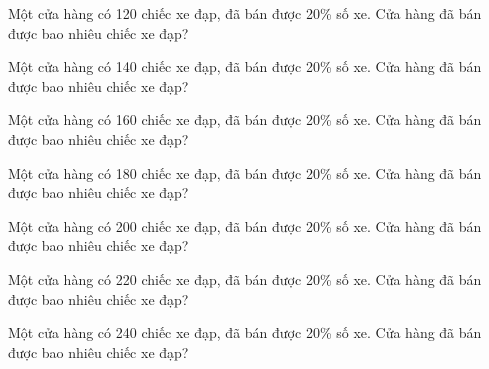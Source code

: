 
\begin{ex}
  Một cửa hàng có 120 chiếc xe đạp, đã bán được 20\% số xe. Cửa hàng đã bán được bao nhiêu chiếc xe đạp?
\end{ex}

\begin{ex}
  Một cửa hàng có 140 chiếc xe đạp, đã bán được 20\% số xe. Cửa hàng đã bán được bao nhiêu chiếc xe đạp?
\end{ex}

\begin{ex}
  Một cửa hàng có 160 chiếc xe đạp, đã bán được 20\% số xe. Cửa hàng đã bán được bao nhiêu chiếc xe đạp?
\end{ex}

\begin{ex}
  Một cửa hàng có 180 chiếc xe đạp, đã bán được 20\% số xe. Cửa hàng đã bán được bao nhiêu chiếc xe đạp?
\end{ex}

\begin{ex}
  Một cửa hàng có 200 chiếc xe đạp, đã bán được 20\% số xe. Cửa hàng đã bán được bao nhiêu chiếc xe đạp?
\end{ex}

\begin{ex}
  Một cửa hàng có 220 chiếc xe đạp, đã bán được 20\% số xe. Cửa hàng đã bán được bao nhiêu chiếc xe đạp?
\end{ex}

\begin{ex}
  Một cửa hàng có 240 chiếc xe đạp, đã bán được 20\% số xe. Cửa hàng đã bán được bao nhiêu chiếc xe đạp?
\end{ex}

